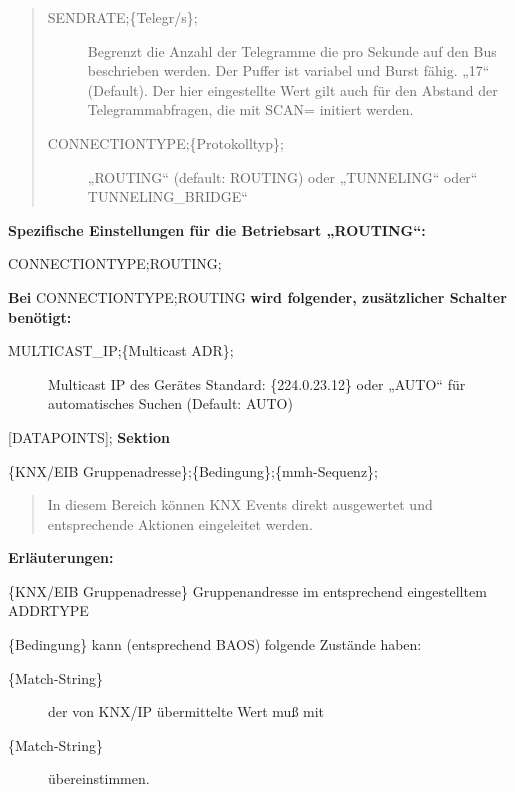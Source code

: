 \documentclass[letterpaper,10pt,english]{sphinxmanual}
\begin{document}
\begin{quote}
\begin{description}
\begin{description}
\end{description}

\item[{SENDRATE;\{Telegr/s\};}] \leavevmode
Begrenzt die Anzahl der Telegramme die pro Sekunde auf den Bus beschrieben werden. Der Puffer ist variabel und Burst fähig. „17“ (Default). Der hier eingestellte Wert gilt auch für den Abstand der Telegrammabfragen, die mit SCAN= initiert werden.

\item[{CONNECTIONTYPE;\{Protokolltyp\};}] \leavevmode
„ROUTING“ (default: ROUTING)
oder „TUNNELING“
oder“ TUNNELING\_BRIDGE“

\end{description}
\end{quote}

\textbf{Spezifische Einstellungen für die Betriebsart „ROUTING“:}

CONNECTIONTYPE;ROUTING;

\textbf{Bei} CONNECTIONTYPE;ROUTING \textbf{wird folgender, zusätzlicher Schalter benötigt:}
\begin{description}
\item[{MULTICAST\_IP;\{Multicast ADR\};}] \leavevmode
Multicast IP des Gerätes Standard:
\{224.0.23.12\} oder „AUTO“ für automatisches Suchen
(Default: AUTO)

\end{description}

{[}DATAPOINTS{]}; \textbf{Sektion}

\{KNX/EIB Gruppenadresse\};\{Bedingung\};\{mmh-Sequenz\};
\begin{quote}

In diesem Bereich können KNX Events direkt ausgewertet und entsprechende Aktionen eingeleitet werden.
\end{quote}

\textbf{Erläuterungen:}

\{KNX/EIB Gruppenadresse\} Gruppenandresse im entsprechend eingestelltem ADDRTYPE

\{Bedingung\}     kann (entsprechend BAOS) folgende Zustände haben:
\begin{description}
\item[{\{Match-String\}}] \leavevmode
der von KNX/IP übermittelte Wert muß mit

\item[{\{Match-String\}}] \leavevmode
übereinstimmen.

\end{description}
\end{document}
